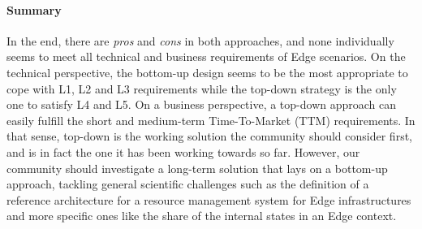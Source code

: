 \paragraph{Summary}
In the end, there are \emph{pros} and \emph{cons} in both approaches,
and none individually seems to meet all technical and business
requirements of Edge scenarios.
On the technical perspective, the bottom-up
design seems to be the most appropriate to cope with L1, L2 and L3
requirements while the top-down strategy is the only one to satisfy L4
and L5.
%
On a business perspective, a top-down approach can easily fulfill the short and
medium-term Time-To-Market (TTM) requirements. In that sense, top-down is the
working solution the community should consider first, and is in fact the one it
has been working towards so far. However, our community should investigate a
long-term solution that lays on a bottom-up approach, tackling general
scientific challenges such as the definition of a reference architecture for a
resource management system for Edge infrastructures and more specific ones like
the share of the internal states in an Edge context.











